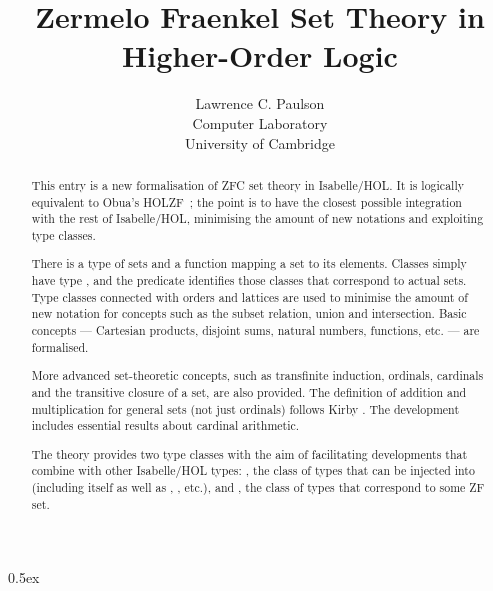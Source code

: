 \documentclass[11pt,a4paper]{article}
\begin{document}
\title{Zermelo Fraenkel Set Theory in Higher-Order Logic}
\author{Lawrence C. Paulson\\ Computer Laboratory\\ University of Cambridge}

\maketitle

\begin{abstract}
This entry is a new formalisation of ZFC set theory in Isabelle/HOL\@.
It is logically equivalent to Obua's HOLZF~\cite{obua-partizan-games}; the point is to have the closest possible integration
with the rest of Isabelle/HOL, minimising the amount of new notations and exploiting type classes.

There is a type  of sets and a function 
 mapping a set to its elements.
Classes simply have type , and the predicate  identifies those classes that correspond to actual sets.
Type classes connected with orders and lattices are used to minimise the amount of new notation
for concepts such as the subset relation, union and intersection.
Basic concepts --- Cartesian products, disjoint sums, natural numbers, functions, etc. --- are formalised.

More advanced set-theoretic concepts, such as transfinite induction, ordinals, cardinals
and the transitive closure of a set, are also provided.
The definition of addition and multiplication for general sets (not just ordinals) follows Kirby \cite{kirby-addition}.
The development includes essential results about cardinal arithmetic.

The theory provides two type classes with the aim of
facilitating developments that combine  with other Isabelle/HOL types:
, the class of types that can be injected into~ (including  itself as well as , , etc.), and
, the class of types that correspond to some ZF set.
\end{abstract}

\newpage
\tableofcontents

\parindent 0pt\parskip 0.5ex

\newpage




\end{document}
